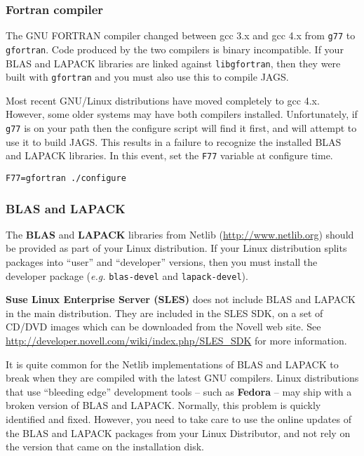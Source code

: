 \documentclass[11pt, a4paper, titlepage]{article}
\newcommand{\JAGS}{\textsf{JAGS}}
\begin{document}
\subsubsection{Fortran compiler}

The GNU FORTRAN compiler changed between gcc 3.x and gcc 4.x from
\verb+g77+ to \verb+gfortran+. Code produced by the two compilers is
binary incompatible. If your BLAS and LAPACK libraries are linked
against \verb+libgfortran+, then they were built with \verb+gfortran+
and you must also use this to compile \JAGS. 

Most recent GNU/Linux distributions have moved completely to gcc 4.x.
However, some older systems may have both compilers installed.
Unfortunately, if \verb+g77+ is on your path then the configure script
will find it first, and will attempt to use it to build \JAGS. This
results in a failure to recognize the installed BLAS and LAPACK
libraries. In this event, set the \verb+F77+ variable at configure time.
\begin{verbatim}
F77=gfortran ./configure
\end{verbatim}

\subsubsection{BLAS and LAPACK}

The {\bf BLAS} and {\bf LAPACK} libraries from Netlib
(\url{http://www.netlib.org}) should be provided as part of your Linux
distribution. If your Linux distribution splits packages into ``user''
and ``developer'' versions, then you must install the developer
package ({\em e.g.}  \texttt{blas-devel} and \texttt{lapack-devel}).

{\bf Suse Linux Enterprise Server (SLES)} does not include BLAS and
LAPACK in the main distribution. They are included in the SLES SDK, on
a set of CD/DVD images which can be downloaded from the Novell web
site.  See \url{http://developer.novell.com/wiki/index.php/SLES_SDK}
for more information.

It is quite common for the Netlib implementations of BLAS and LAPACK
to break when they are compiled with the latest GNU compilers.  Linux
distributions that use ``bleeding edge'' development tools -- such as
{\bf Fedora} -- may ship with a broken version of BLAS and
LAPACK. Normally, this problem is quickly identified and
fixed. However, you need to take care to use the online updates of the
BLAS and LAPACK packages from your Linux Distributor, and not rely on
the version that came on the installation disk.
\end{document}
